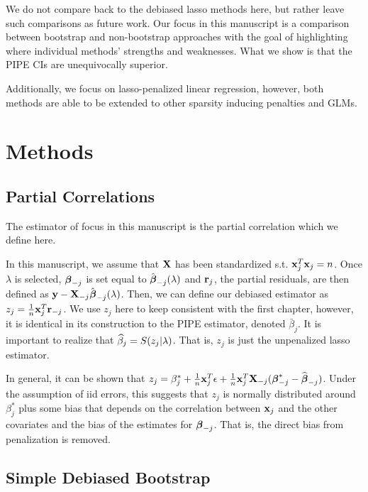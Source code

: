 We do not compare back to the debiased lasso methods here, but rather leave such comparisons as future work. Our focus in this manuscript is a comparison between bootstrap and non-bootstrap approaches with the goal of highlighting where individual methods' strengths and weaknesses. What we show is that the PIPE CIs are unequivocally superior. 

Additionally, we focus on lasso-penalized linear regression, however, both methods are able to be extended to other sparsity inducing penalties and GLMs. 

\section{Methods}

\subsection{Partial Correlations}

The estimator of focus in this manuscript is the partial correlation which we define here. 

In this manuscript, we assume that $\mathbf{X}$ has been standardized s.t. $\mathbf{x}_j^T\mathbf{x}_j = n$. Once $\lambda$ is selected, $\boldsymbol{\beta}_{-j}$ is set equal to $\hat{\boldsymbol{\beta}}_{-j}(\lambda)$ and $\mathbf{r}_{j}$, the partial residuals, are then defined as $\mathbf{y} - \mathbf{X}_{-j}\hat{\boldsymbol{\beta}}_{-j}(\lambda)$. Then, we can define our debiased estimator as $z_j = \frac{1}{n}\mathbf{x}_j^T\mathbf{r}_{-j}$. We use $z_j$ here to keep consistent with the first chapter, however, it is identical in its construction to the PIPE estimator, denoted $\bar{\beta}_j$. It is important to realize that $\widehat{\beta}_j = S(z_j|\lambda)$. That is, $z_j$ is just the unpenalized lasso estimator. 

In general, it can be shown that $z_j = \beta^*_j + \frac{1}{n}\mathbf{x}_j^T \epsilon + \frac{1}{n}\mathbf{x}_j^T \mathbf{X}_{-j}(\boldsymbol{\beta}^*_{-j} - \widehat{\boldsymbol{\beta}}_{-j})$. Under the assumption of iid errors, this suggests that $z_j$ is normally distributed around $\beta^*_j$ plus some bias that depends on the correlation between $\mathbf{x}_j$ and the other covariates and the bias of the estimates for $\boldsymbol{\beta}_{-j}$. That is, the direct bias from penalization is removed. 


\subsection{Simple Debiased Bootstrap}

